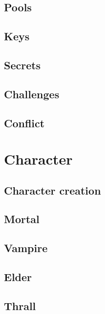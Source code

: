\documentclass[a4paper, 12pt, finnish]{article}
\begin{document}
	\subsection{Pools}\label{ssec:pools}
		
	\subsection{Keys}\label{ssec:keys}
		
	\subsection{Secrets}\label{ssec:secrets}
		
	\subsection{Challenges}\label{ssec:challenges} %
		
	\subsection{Conflict}\label{ssec:conflict} %
		
\section{Character}
	\subsection{Character creation}\label{ssec:creation}
		
	\subsection{Mortal}\label{ssec:mortal}
		
	\subsection{Vampire}\label{ssec:vampire} %
		
	\subsection{Elder}\label{ssec:elder} %
		
	\subsection{Thrall}\label{ssec:thrall}
		
\end{document}
